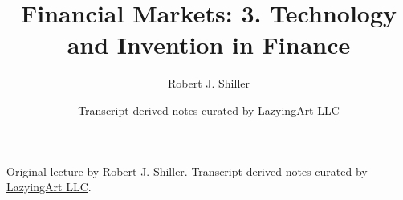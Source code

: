 \documentclass[11pt,oneside]{book}
\begin{document}
\frontmatter
\title{Financial Markets: 3. Technology and Invention in Finance}
\author{Robert J. Shiller}
\date{Transcript-derived notes curated by \href{https://lazying.art}{LazyingArt LLC}}
\maketitle
\begin{center}
\small Original lecture by Robert J. Shiller. Transcript-derived notes curated by \href{https://lazying.art}{LazyingArt LLC}.
\end{center}
\clearpage
\mainmatter

\end{document}
